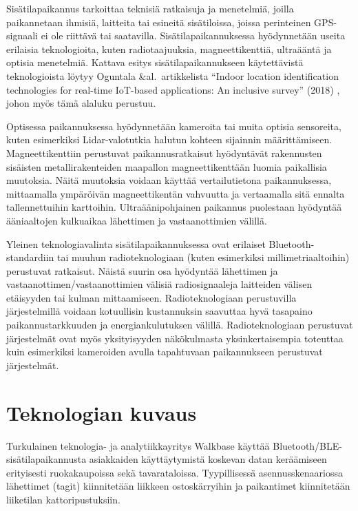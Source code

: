 \documentclass[
  12pt,
  a4paper, twoside]{book}
\begin{document}
Sisätilapaikannus tarkoittaa teknisiä ratkaisuja ja menetelmiä, joilla paikannetaan ihmisiä, laitteita tai esineitä sisätiloissa, joissa perinteinen GPS-signaali ei ole riittävä tai saatavilla. Sisätilapaikannuksessa hyödynnetään useita erilaisia teknologioita, kuten radiotaajuuksia, magneettikenttiä, ultraääntä ja optisia menetelmiä. Kattava esitys sisätilapaikannukseen käytettävistä teknologioista löytyy Oguntala \&al.~artikkelista ``Indoor location identification technologies for real-time IoT-based applications: An inclusive survey'' (2018) \citep{oguntala-2018}, johon myös tämä alaluku perustuu.

Optisessa paikannuksessa hyödynnetään kameroita tai muita optisia sensoreita, kuten esimerkiksi Lidar-valotutkia halutun kohteen sijainnin määrittämiseen. Magneettikenttiin perustuvat paikannusratkaisut hyödyntävät rakennusten sisäisten metallirakenteiden maapallon magneettikenttään luomia paikallisia muutoksia. Näitä muutoksia voidaan käyttää vertailutietona paikannuksessa, mittaamalla ympäröivän magneettikentän vahvuutta ja vertaamalla sitä ennalta tallennettuihin karttoihin. Ultraäänipohjainen paikannus puolestaan hyödyntää ääniaaltojen kulkuaikaa lähettimen ja vastaanottimien välillä.

Yleinen teknologiavalinta sisätilapaikannuksessa ovat erilaiset Bluetooth-standardiin tai muuhun radioteknologiaan (kuten esimerkiksi millimetriaaltoihin) perustuvat ratkaisut. Näistä suurin osa hyödyntää lähettimen ja vastaanottimen/vastaanottimien välisiä radiosignaaleja laitteiden välisen etäisyyden tai kulman mittaamiseen. Radioteknologiaan perustuvilla järjestelmillä voidaan kotuullisin kustannuksin saavuttaa hyvä tasapaino paikannustarkkuuden ja energiankulutuksen välillä. Radioteknologiaan perustuvat järjestelmät ovat myös yksityisyyden näkökulmasta yksinkertaisempia toteuttaa kuin esimerkiksi kameroiden avulla tapahtuvaan paikannukseen perustuvat järjestelmät.

\section{Teknologian kuvaus}

Turkulainen teknologia- ja analytiikkayritys Walkbase käyttää Bluetooth/BLE-sisätilapaikannusta asiakkaiden käyttäytymistä koskevan datan keräämiseen erityisesti ruokakaupoissa sekä tavarataloissa. Tyypillisessä asennusskenaariossa lähettimet (tagit) kiinnitetään liikkeen ostoskärryihin ja paikantimet kiinnitetään liiketilan kattoripustuksiin.
\end{document}
